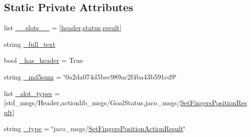 \subsection*{Static Private Attributes}
\begin{DoxyCompactItemize}
\item 
list \hyperlink{classjaco__msgs_1_1msg_1_1__SetFingersPositionActionResult_1_1SetFingersPositionActionResult_ad29d09de257baf4f946bc04b7aa7a4b0}{\+\_\+\+\_\+slots\+\_\+\+\_\+} = \mbox{[}\textquotesingle{}\hyperlink{classjaco__msgs_1_1msg_1_1__SetFingersPositionActionResult_1_1SetFingersPositionActionResult_a578636082863e06998608eb35d75247e}{header}\textquotesingle{},\textquotesingle{}\hyperlink{classjaco__msgs_1_1msg_1_1__SetFingersPositionActionResult_1_1SetFingersPositionActionResult_a8016c483130116d802bbcec18e870dd4}{status}\textquotesingle{},\textquotesingle{}\hyperlink{classjaco__msgs_1_1msg_1_1__SetFingersPositionActionResult_1_1SetFingersPositionActionResult_aaebdd800974fde0a151e234d665ee6c3}{result}\textquotesingle{}\mbox{]}
\item 
string \hyperlink{classjaco__msgs_1_1msg_1_1__SetFingersPositionActionResult_1_1SetFingersPositionActionResult_a61f242fcf0937c963c59c69542558de6}{\+\_\+full\+\_\+text}
\item 
bool \hyperlink{classjaco__msgs_1_1msg_1_1__SetFingersPositionActionResult_1_1SetFingersPositionActionResult_a5c40bbc6c74ddffeebace99cb2d68dae}{\+\_\+has\+\_\+header} = True
\item 
string \hyperlink{classjaco__msgs_1_1msg_1_1__SetFingersPositionActionResult_1_1SetFingersPositionActionResult_a0f7fdf49040c3c4a99e08370b6f1a780}{\+\_\+md5sum} = \char`\"{}0a2da074d5bec989ac2f4ba43b591cd9\char`\"{}
\item 
list \hyperlink{classjaco__msgs_1_1msg_1_1__SetFingersPositionActionResult_1_1SetFingersPositionActionResult_a1136051749710ab7892e2d1f2d95fc2e}{\+\_\+slot\+\_\+types} = \mbox{[}\textquotesingle{}std\+\_\+msgs/Header\textquotesingle{},\textquotesingle{}actionlib\+\_\+msgs/Goal\+Status\textquotesingle{},\textquotesingle{}jaco\+\_\+msgs/\hyperlink{classjaco__msgs_1_1msg_1_1__SetFingersPositionResult_1_1SetFingersPositionResult}{Set\+Fingers\+Position\+Result}\textquotesingle{}\mbox{]}
\item 
string \hyperlink{classjaco__msgs_1_1msg_1_1__SetFingersPositionActionResult_1_1SetFingersPositionActionResult_ade312a7a3fa5f01690fe9fb5ad47bae6}{\+\_\+type} = \char`\"{}jaco\+\_\+msgs/\hyperlink{classjaco__msgs_1_1msg_1_1__SetFingersPositionActionResult_1_1SetFingersPositionActionResult}{Set\+Fingers\+Position\+Action\+Result}\char`\"{}
\end{DoxyCompactItemize}


